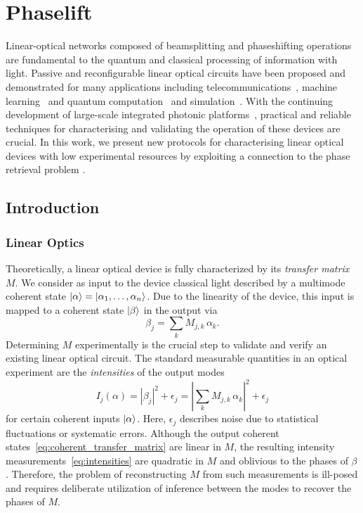 \chapter{Phaselift}%
\label{chap:phaselift}



Linear-optical networks composed of beamsplitting and phaseshifting operations are fundamental to the quantum and classical processing of information with light.
Passive and reconfigurable linear optical circuits have been proposed and demonstrated for many applications including telecommunications~\cite{Miller2015}, machine learning~\cite{Shen2017} and quantum computation~\cite{Carolan2015} and simulation~\cite{Harris2017}.
With the continuing development of large-scale integrated photonic platforms~\cite{Silverstone2016,Seok2016}, practical and reliable techniques for characterising and validating the operation of these devices are crucial.
In this work, we present new protocols for characterising linear optical devices with low experimental resources by exploiting a connection to the phase retrieval problem \cite{walther_question_1963}.

\section{Introduction}
\subsection{Linear Optics}

Theoretically, a linear optical device is fully characterized by its \emph{transfer matrix} ${M}$.
We consider as input to the device classical light described by a multimode coherent state $\ket{{\alpha}} = \ket{\alpha_1, \ldots, \alpha_n}$.
Due to the linearity of the device, this input is mapped to a coherent state $\ket{{\beta}}$ in the output via
\[
  \beta_j = \sum_k M_{j,k} \,\alpha_k.
  \label{eq:coherent_transfer_matrix}
\]
Determining ${M}$ experimentally is the crucial step to validate and verify an existing linear optical circuit.
The standard measurable quantities in an optical experiment are the \emph{intensities} of the output modes
\[
  I_j({\alpha})
  = \left| \beta_j \right|^2 + \epsilon_j
  = \left| \sum_k M_{j,k} \, \alpha_k \right|^2 + \epsilon_j
  \label{eq:intensities}
\]
for certain coherent inputs $\ket{{\alpha}}$.
Here, $\epsilon_j$ describes noise due to statistical fluctuations or systematic errors.
Although the output coherent states~\eqref{eq:coherent_transfer_matrix} are linear in ${M}$, the resulting intensity measurements~\eqref{eq:intensities} are quadratic in ${M}$ and oblivious to the phases of $\beta$.
Therefore, the problem of reconstructing ${M}$ from such measurements is ill-posed and requires deliberate utilization of inference between the modes to recover the phases of $M$.

